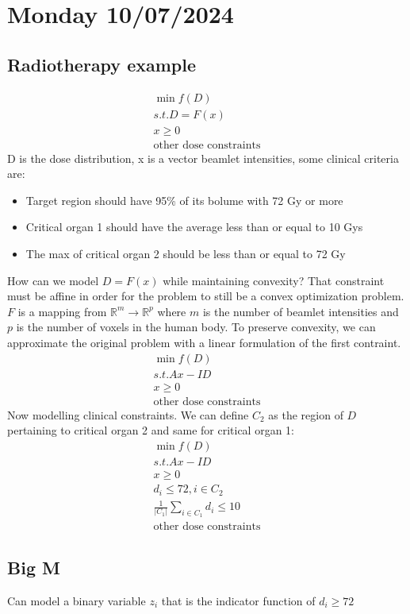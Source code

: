 \section{Monday 10/07/2024}
\subsection{Radiotherapy example}
\begin{equation}
  \begin{aligned}
    \min f(D) \\
    s.t. D = F(x) \\
    x \geq 0 \\
    \text{other dose constraints}
  \end{aligned}
\end{equation}
D is the dose distribution, x is a vector beamlet intensities, some clinical criteria are:
\begin{itemize}
  \item Target region should have 95\% of its bolume with 72 Gy or more
  \item Critical organ 1 should have the average less than or equal to 10 Gys
  \item The max of critical organ 2 should be less than or equal to 72 Gy
\end{itemize}
How can we model $D= F(x)$ while maintaining convexity? That constraint must be affine in order for the problem to still be a convex optimization problem. $F$ is a mapping from $\mathbb{R}^m \to \mathbb{R}^p$ where $m$ is the number of beamlet intensities and $p$ is the number of voxels in the human body. To preserve convexity, we can approximate the original problem with a linear formulation of the first contraint.
\begin{equation}
  \begin{aligned}
    \min f(D) \\
    s.t. Ax-ID \\
    x \geq 0 \\
    \text{other dose constraints}
  \end{aligned}
\end{equation}
Now modelling clinical constraints. We can define $C_2$ as the region of $D$ pertaining to critical organ 2 and same for critical organ 1:
\begin{equation}
  \begin{aligned}
    \min f(D) \\
    s.t. Ax-ID \\
    x \geq 0 \\
    d_i \leq 72, i \in C_2 \\
    \frac{1}{|C_1|}\sum_{i \in C_1} d_i \leq 10 \\
    \text{other dose constraints}
  \end{aligned}
\end{equation}

\subsection{Big M}
Can model a binary variable $z_i$ that is the indicator function of $d_i \geq 72$